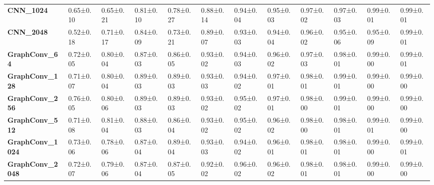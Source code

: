 \begin{tabular}{llllllllllll}
\textbf{CNN\_1024      } &   0.65±0.10 &  0.65±0.21 &  0.81±0.10 &  0.78±0.27 &  0.88±0.14 &  0.94±0.04 &  0.95±0.03 &  0.97±0.02 &  0.97±0.03 &   0.99±0.01 &   0.99±0.01 \\
\textbf{CNN\_2048      } &   0.52±0.18 &  0.71±0.17 &  0.84±0.09 &  0.73±0.21 &  0.89±0.07 &  0.93±0.03 &  0.94±0.04 &  0.96±0.02 &  0.95±0.06 &   0.95±0.09 &   0.99±0.01 \\
\textbf{GraphConv\_64  } &   0.72±0.05 &  0.80±0.04 &  0.87±0.03 &  0.86±0.05 &  0.93±0.02 &  0.94±0.03 &  0.96±0.02 &  0.97±0.03 &  0.98±0.01 &   0.99±0.00 &   0.99±0.01 \\
\textbf{GraphConv\_128 } &   0.71±0.07 &  0.80±0.04 &  0.89±0.03 &  0.89±0.03 &  0.93±0.03 &  0.94±0.02 &  0.97±0.01 &  0.98±0.01 &  0.99±0.01 &   0.99±0.00 &   0.99±0.00 \\
\textbf{GraphConv\_256 } &   0.76±0.05 &  0.80±0.06 &  0.89±0.03 &  0.89±0.03 &  0.93±0.02 &  0.95±0.02 &  0.97±0.01 &  0.98±0.00 &  0.99±0.01 &   0.99±0.00 &   0.99±0.00 \\
\textbf{GraphConv\_512 } &   0.71±0.08 &  0.81±0.04 &  0.88±0.03 &  0.86±0.04 &  0.93±0.02 &  0.95±0.02 &  0.96±0.02 &  0.98±0.00 &  0.98±0.01 &   0.99±0.01 &   0.99±0.00 \\
\textbf{GraphConv\_1024} &   0.73±0.06 &  0.78±0.06 &  0.87±0.04 &  0.89±0.04 &  0.93±0.03 &  0.94±0.02 &  0.96±0.01 &  0.98±0.01 &  0.98±0.01 &   0.99±0.00 &   0.99±0.01 \\
\textbf{GraphConv\_2048} &   0.72±0.07 &  0.79±0.06 &  0.87±0.04 &  0.87±0.05 &  0.92±0.02 &  0.96±0.02 &  0.96±0.02 &  0.98±0.01 &  0.98±0.01 &   0.99±0.00 &   0.99±0.00 \\
\bottomrule
\end{tabular}
